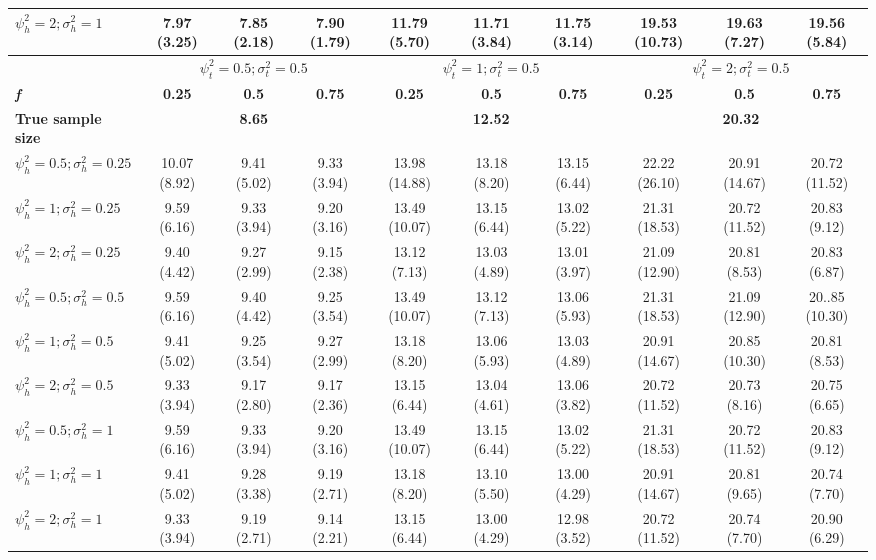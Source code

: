 \begin{table}[ht]
{\begin{tabular}{l c c c c c c c c c}
$\psi_h^2 = 2; \sigma_h^2 = 1$ & 7.97 (3.25) & 7.85 (2.18) & 7.90 (1.79) & 11.79 (5.70) & 11.71 (3.84) & 11.75 (3.14) & 19.53 (10.73) & 19.63 (7.27) & 19.56 (5.84) \\
\hline 
 & \multicolumn{3}{c}{$\psi_t^2 = 0.5; \sigma_t^2 = 0.5$} & \multicolumn{3}{c}{$\psi_t^2 = 1; \sigma_t^2 = 0.5$} & \multicolumn{3}{c}{$\psi_t^2= 2; \sigma_t^2 = 0.5$} \\
\addlinespace[1pt]
\cmidrule(lr){2-4} \cmidrule(lr){5-7} \cmidrule(lr){8-10}
\textbf{\textit{f}} & \textbf{0.25} & \textbf{0.5} & \textbf{0.75} & \textbf{0.25} & \textbf{0.5} & \textbf{0.75} & \textbf{0.25} & \textbf{0.5} & \textbf{0.75} \\
\hline
\textbf{True sample size} & \multicolumn{3}{c}{\textbf{8.65}} & \multicolumn{3}{c}{\textbf{12.52}} & \multicolumn{3}{c}{\textbf{20.32}} \\
$\psi_h^2 = 0.5; \sigma_h^2 = 0.25$ & 10.07 (8.92) & 9.41 (5.02) & 9.33 (3.94) & 13.98 (14.88) & 13.18 (8.20) & 13.15 (6.44) & 22.22 (26.10) & 20.91 (14.67) & 20.72 (11.52) \\
$\psi_h^2 = 1; \sigma_h^2 = 0.25$ & 9.59 (6.16) & 9.33 (3.94) & 9.20 (3.16) & 13.49 (10.07) & 13.15 (6.44) & 13.02 (5.22) & 21.31 (18.53) & 20.72 (11.52) & 20.83 (9.12) \\
$\psi_h^2 = 2; \sigma_h^2 = 0.25$ & 9.40 (4.42) & 9.27 (2.99) & 9.15 (2.38) & 13.12 (7.13) & 13.03 (4.89) & 13.01 (3.97) & 21.09 (12.90) & 20.81 (8.53) & 20.83 (6.87) \\
$\psi_h^2 = 0.5; \sigma_h^2 = 0.5$ & 9.59 (6.16) & 9.40 (4.42) & 9.25 (3.54) & 13.49 (10.07) & 13.12 (7.13) & 13.06 (5.93) & 21.31 (18.53) & 21.09 (12.90) & 20..85 (10.30) \\
$\psi_h^2 = 1; \sigma_h^2 = 0.5$ & 9.41 (5.02) & 9.25 (3.54) & 9.27 (2.99) & 13.18 (8.20) & 13.06 (5.93) & 13.03 (4.89) & 20.91 (14.67) & 20.85 (10.30) & 20.81 (8.53) \\
$\psi_h^2 = 2; \sigma_h^2 = 0.5$ & 9.33 (3.94) & 9.17 (2.80) & 9.17 (2.36) & 13.15 (6.44) & 13.04 (4.61) & 13.06 (3.82) & 20.72 (11.52) & 20.73 (8.16) & 20.75 (6.65) \\
$\psi_h^2 = 0.5; \sigma_h^2 = 1$ & 9.59 (6.16) & 9.33 (3.94) & 9.20 (3.16) & 13.49 (10.07) & 13.15 (6.44) & 13.02 (5.22) & 21.31 (18.53) &  20.72 (11.52) & 20.83 (9.12) \\
$\psi_h^2 = 1; \sigma_h^2 = 1$ & 9.41 (5.02) & 9.28 (3.38) & 9.19 (2.71) & 13.18 (8.20) & 13.10 (5.50) & 13.00 (4.29) & 20.91 (14.67) & 20.81 (9.65) & 20.74 (7.70) \\
$\psi_h^2 = 2; \sigma_h^2 = 1$ & 9.33 (3.94) & 9.19 (2.71) & 9.14 (2.21) & 13.15 (6.44) & 13.00 (4.29) & 12.98 (3.52) & 20.72 (11.52) & 20.74 (7.70) & 20.90 (6.29) \\

\end{tabular}}
\end{table}
